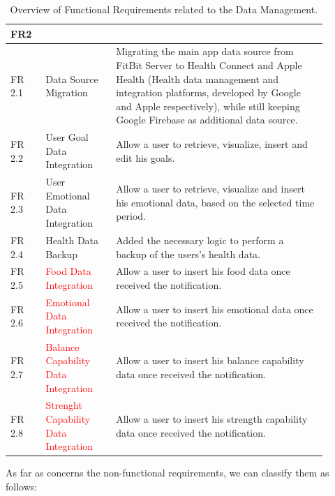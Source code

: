 \begin{table}[h!]
    \centering
    \begin{tabular}{|>{\raggedright\arraybackslash}p{0.1\linewidth}|>{\raggedright\arraybackslash}p{0.2\linewidth}|>{\raggedright\arraybackslash}p{0.6\linewidth}|}
        \hline
        \textbf{FR2} & \multicolumn{2}{>{\centering\arraybackslash}p{0.7\linewidth}|}{\textbf{Data Management}} \\
        \hline
        FR 2.1 & Data Source Migration & Migrating the main app data source from FitBit Server to Health Connect and Apple Health (Health data management and integration platforms, developed by Google and Apple respectively), while still keeping Google Firebase as additional data source. \\
        \hline
        FR 2.2 & User Goal Data Integration & Allow a user to retrieve, visualize, insert and edit his goals. \\
        \hline
        FR 2.3 & User Emotional Data Integration & Allow a user to retrieve, visualize and insert his emotional data, based on the selected time period. \\
        \hline
        FR 2.4 & Health Data Backup & Added the necessary logic to perform a backup of the users's health data. \\
        \hline
        FR 2.5 & \textcolor{red}{Food Data Integration} & Allow a user to insert his food data once received the notification. \\
        \hline
        FR 2.6 & \textcolor{red}{Emotional Data Integration} & Allow a user to insert his emotional data once received the notification. \\
        \hline
        FR 2.7 & \textcolor{red}{Balance Capability Data Integration} & Allow a user to insert his balance capability data once received the notification. \\
        \hline
        FR 2.8 & \textcolor{red}{Strenght Capability Data Integration} & Allow a user to insert his strength capability data once received the notification. \\
        \hline
    \end{tabular}
    \caption{Overview of Functional Requirements related to the Data Management.}
    \label{tab:fr2}
\end{table}

\clearpage

\noindent As far as concerns the non-functional requirements, we can classify them as follows:

